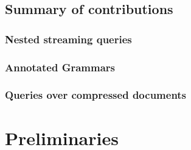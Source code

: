 \documentclass[pdftex]{pucthesis}	%
\begin{document}
\section{Summary of contributions}

\subsection{Nested streaming queries}



\subsection{Annotated Grammars}



\subsection{Queries over compressed documents}





\chapter[PRELIMINARIES]{Preliminaries}

%
%
%
%
%
%
%
%
%
%


\end{document}
